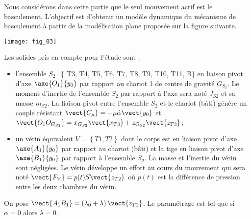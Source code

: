 \begin{multicols}{2}
Nous considérons dans cette partie que le seul mouvement actif est le basculement.
L’objectif est d’obtenir un modèle dynamique du mécanisme de basculement à partir de la modélisation plane proposée sur la figure suivante.


\begin{center}
\texttt{[image: fig\_03]}
\end{center}

Les solides pris en compte pour l’étude sont :
\begin{itemize}
\item l'ensemble $S_2$=\{ T3, T4, T5, T6, T7, T8, T9, T10, T11, B\} en liaison pivot d'axe $\axe{O_1}{y_0}$ par rapport au chariot 1 de centre de gravité $G_{S_2}$. Le moment d’inertie de l’ensemble $S_2$ par rapport à l’axe sera noté $J_{S2}$ et sa masse $m_{S2}$. La liaison pivot entre l’ensemble $S_2$ et le chariot (bâti) génère un couple résistant $\vect{C_{\mu}}=-\mu\dot{\alpha}\vect{y_0}$ et $\vect{O_1O_{G_{S2}}}=x_{G_{S2}} \vect{x_{T3}}+z_{G_{S2}} \vect{z_{T3}}$; 
\item un vérin équivalent $V=\left\{ T1,T2\right\}$ dont le corps est en liaison pivot d’axe $\axe{A_1}{y_0}$ par rapport au chariot (bâti) et la tige en liaison pivot d’axe $\axe{B_1}{y_0}$ par rapport à l’ensemble $S_2$. La masse et l’inertie du vérin sont négligées. Le vérin développe un effort au cours du mouvement qui sera noté $\vect{F_V} = p(t) S \vect{z_{T2}}$ où $p(t)$ est la différence de pression entre les deux chambres du vérin.
\end{itemize}


On pose $\vect{A_1B_1} = \left( \lambda_0+\lambda\right)\vect{z_{T2}}$. Le paramétrage est tel que si $\alpha=0$ alors $\lambda=0$.

%
%


\ifprof
\begin{corrige}
\end{corrige}
\else
\fi

\ifprof
\else
\end{multicols}%
\fi

